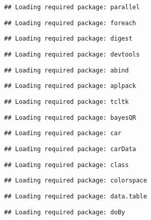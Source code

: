 \documentclass[11pt,]{article}
\begin{document}
\begin{verbatim}
## Loading required package: parallel
\end{verbatim}

\begin{verbatim}
## Loading required package: foreach
\end{verbatim}

\begin{verbatim}
## Loading required package: digest
\end{verbatim}

\begin{verbatim}
## Loading required package: devtools
\end{verbatim}

\begin{verbatim}
## Loading required package: abind
\end{verbatim}

\begin{verbatim}
## Loading required package: aplpack
\end{verbatim}

\begin{verbatim}
## Loading required package: tcltk
\end{verbatim}

\begin{verbatim}
## Loading required package: bayesQR
\end{verbatim}

\begin{verbatim}
## Loading required package: car
\end{verbatim}

\begin{verbatim}
## Loading required package: carData
\end{verbatim}

\begin{verbatim}
## Loading required package: class
\end{verbatim}

\begin{verbatim}
## Loading required package: colorspace
\end{verbatim}

\begin{verbatim}
## Loading required package: data.table
\end{verbatim}

\begin{verbatim}
## Loading required package: doBy
\end{verbatim}
\end{document}
